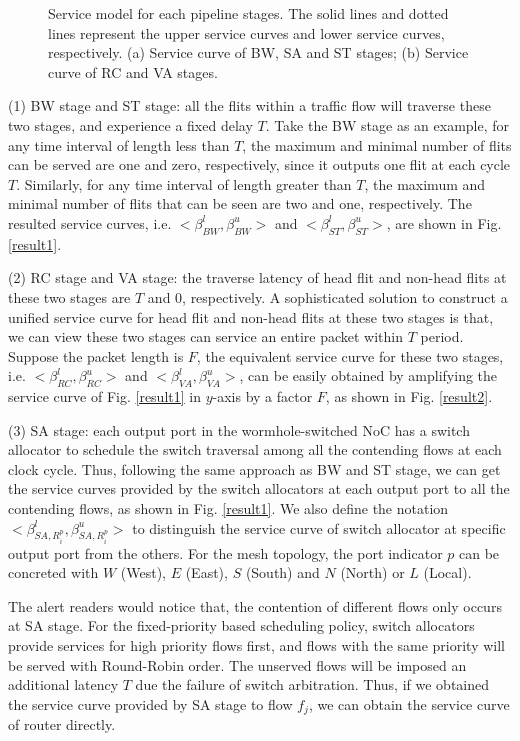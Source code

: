\documentclass[10pt,journal]{IEEEtran}
\begin{document}
\begin{figure}
  \caption{Service model for each pipeline stages. The solid lines and dotted lines represent the upper service curves and lower service curves, respectively. (a) Service curve of BW, SA and ST stages; (b) Service curve of RC and VA stages.}
\end{figure}

(1) BW stage and ST stage: all the flits within a traffic flow will traverse these two stages, and experience a fixed delay $T$. Take the BW stage as an example, for any time interval of length less than $T$, the maximum and minimal number of flits can be served are one and zero, respectively, since it outputs one flit at each cycle $T$. Similarly, for any time interval of length greater than $T$, the maximum and minimal number of flits that can be seen are two and one, respectively. The resulted service curves, i.e. $<\beta^l_{BW},\beta^u_{BW}>$ and $<\beta^l_{ST},\beta^u_{ST}>$, are shown in Fig. \ref{result1}.

(2) RC stage and VA stage: the traverse latency of head flit and non-head flits at these two stages are $T$ and 0, respectively. A sophisticated solution to construct a unified service curve for head flit and non-head flits at these two stages is that, we can view these two stages can service an entire packet within $T$ period. Suppose the packet length is $F$, the equivalent service curve for these two stages, i.e. $<\beta^l_{RC},\beta^u_{RC}>$ and $<\beta^l_{VA},\beta^u_{VA}>$, can be easily obtained by amplifying the service curve of Fig. \ref{result1} in $y$-axis by a factor $F$, as shown in Fig. \ref{result2}.

(3) SA stage: each output port in the wormhole-switched NoC has a switch allocator to schedule the switch traversal among all the contending flows at each clock cycle. Thus, following the same approach as BW and ST stage, we can get the service curves provided by the switch allocators at each output port to all the contending flows, as shown in Fig. \ref{result1}. We also define the notation $<\beta_{SA,R_i^{p}}^l,\beta_{SA,R_i^{p}}^u>$ to distinguish the service curve of switch allocator at specific output port from the others. For the mesh topology, the port indicator $p$ can be concreted with $W$ (West), $E$ (East), $S$ (South) and $N$ (North) or $L$ (Local).

The alert readers would notice that, the contention of different flows only occurs at SA stage. For the fixed-priority based scheduling policy, switch allocators provide services for high priority flows first, and flows with the same priority will be served with Round-Robin order. The unserved flows will be imposed an additional latency $T$ due the failure of switch arbitration. Thus, if we obtained the service curve provided by SA stage to flow $f_j$, we can obtain the service curve of router directly.
\end{document}
